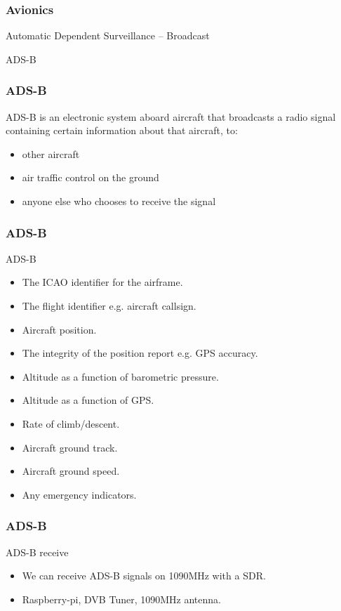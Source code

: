 \begin{frame}
\frametitle{Avionics}
\begin{center}
Automatic Dependent Surveillance -- Broadcast
\par
ADS-B
\end{center}
\end{frame}

\begin{frame}
\frametitle{ADS-B}
\begin{center}
ADS-B is an electronic system aboard aircraft that broadcasts a radio signal containing certain information about that aircraft, to:
\begin{itemize}
\item other aircraft
\item air traffic control on the ground
\item anyone else who chooses to receive the signal
\end{itemize}
\end{center}
\end{frame}

\begin{frame}
\frametitle{ADS-B}
\begin{block}{ADS-B}
\begin{itemize}
\item The ICAO identifier for the airframe.
\item The flight identifier e.g. aircraft callsign.
\item Aircraft position.
\item The integrity of the position report e.g. GPS accuracy.
\item Altitude as a function of barometric pressure.
\item Altitude as a function of GPS.
\item Rate of climb/descent.
\item Aircraft ground track.
\item Aircraft ground speed.
\item Any emergency indicators.
\end{itemize}
\end{block}
\end{frame}

\begin{frame}
\frametitle{ADS-B}
\begin{block}{ADS-B receive}
\begin{itemize}
\item<1-> We can receive ADS-B signals on 1090MHz with a SDR.
\item<2-> Raspberry-pi, DVB Tuner, 1090MHz antenna.
\end{itemize}
\end{block}
\end{frame}

